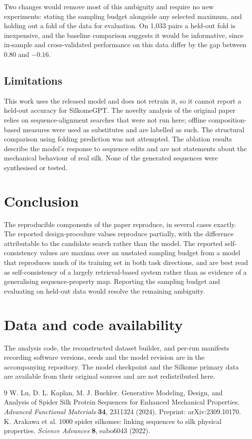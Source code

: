\documentclass[11pt,a4paper]{article}
\begin{document}
Two changes would remove most of this ambiguity and require no new experiments:
stating the sampling budget alongside any selected maximum, and holding out a
fold of the data for evaluation. On 1{,}033 pairs a held-out fold is inexpensive,
and the baseline comparison suggests it would be informative, since in-sample and
cross-validated performance on this data differ by the gap between 0.80 and
$-0.16$.

\subsection*{Limitations}

This work uses the released model and does not retrain it, so it cannot report a
held-out accuracy for SilkomeGPT. The novelty analysis of the original paper
relies on sequence-alignment searches that were not run here; offline
composition-based measures were used as substitutes and are labelled as such. The
structural comparison using folding prediction was not attempted. The ablation
results describe the model's response to sequence edits and are not statements
about the mechanical behaviour of real silk. None of the generated sequences were
synthesised or tested.

\section{Conclusion}

The reproducible components of the paper reproduce, in several cases exactly. The
reported design-procedure values reproduce partially, with the difference
attributable to the candidate search rather than the model. The reported
self-consistency values are maxima over an unstated sampling budget from a model
that reproduces much of its training set in both task directions, and are best
read as self-consistency of a largely retrieval-based system rather than as
evidence of a generalising sequence-property map. Reporting the sampling budget
and evaluating on held-out data would resolve the remaining ambiguity.

\section*{Data and code availability}

The analysis code, the reconstructed dataset builder, and per-run manifests
recording software versions, seeds and the model revision are in the
accompanying repository. The model checkpoint and the Silkome primary data are
available from their original sources and are not redistributed here.

\begin{thebibliography}{9}
\small
{} W. Lu, D. L. Kaplan, M. J. Buehler. Generative Modeling,
Design, and Analysis of Spider Silk Protein Sequences for Enhanced Mechanical
Properties. \textit{Advanced Functional Materials} \textbf{34}, 2311324 (2024).
Preprint: arXiv:2309.10170.
 K. Arakawa et al. 1000 spider silkomes: linking sequences
to silk physical properties. \textit{Science Advances} \textbf{8}, eabo6043
(2022).
\end{thebibliography}
\end{document}

